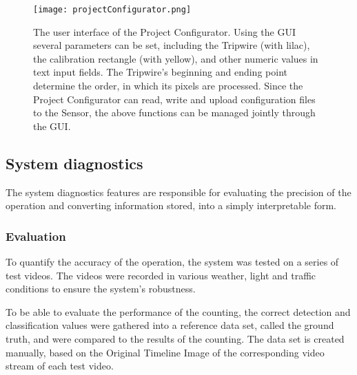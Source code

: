 \begin{figure}[!h]
	\centering
	\texttt{[image: projectConfigurator.png]}
	\caption[The GUI of the Project Configurator]{The user interface of the Project Configurator. Using the GUI several parameters can be set, including the Tripwire (with lilac), the calibration rectangle (with yellow), and other numeric values in text input fields. The Tripwire's beginning and ending point determine the order, in which its pixels are processed. Since the Project Configurator can read, write and upload configuration files to the Sensor, the above functions can be managed jointly through the GUI. \label{fig:project_configurator}}
\end{figure}
\subsection{System diagnostics}\label{sec:system_diagnostics}
The system diagnostics features are responsible for evaluating the precision of the operation and converting information stored, into a simply interpretable form.
\subsubsection{Evaluation}\label{chap:evaluation}
To quantify the accuracy of the operation, the system was tested on a series of test videos.
The videos were recorded in various weather, light and traffic conditions to ensure the system's robustness.

To be able to evaluate the performance of the counting, the correct detection and classification values were gathered into a reference data set, called the ground truth, and were compared to the results of the counting.
The data set is created manually, based on the Original Timeline Image of the corresponding video stream of each test video.

